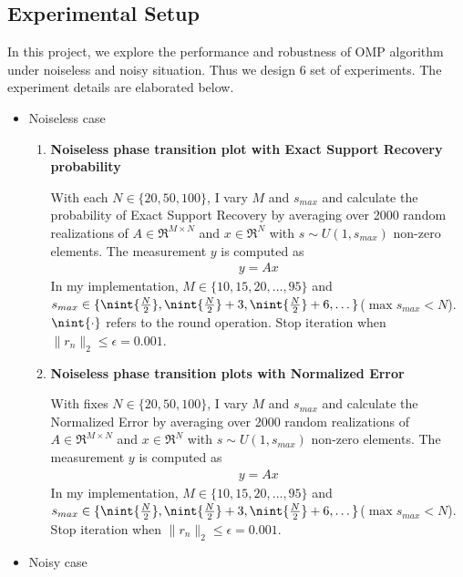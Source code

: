 \documentclass{ucsdreport}
\begin{document}
\subsection{Experimental Setup}
In this project, we explore the performance and robustness of OMP algorithm under noiseless and noisy situation. Thus we design 6 set of experiments. The experiment details are elaborated below.
\begin{itemize}
    \item Noiseless case
    \begin{enumerate}
    
        \item \textbf{Noiseless phase transition plot with Exact Support Recovery probability} 
        
        With each $N \in \{20, 50, 100\}$, I vary $M$ and $s_{max}$ and calculate the probability of Exact Support Recovery by averaging over 2000 random realizations of $A \in \Re^{M \times N}$ and $x \in \Re^N$ with $s\sim U(1,s_{max})$ non-zero elements. The measurement $y$ is computed as
        \begin{align*}
            y = Ax
        \end{align*}
        In my implementation, $M \in \{10,15,20,\dots,95\}$ and $s_{max} \in \{\nint{\frac{N}{2}} ,\nint{\frac{N}{2}}+3, \nint{\frac{N}{2}}+6, \dots\}$($\max s_{max} < N$). $\nint{\cdot}$ refers to the round operation. Stop iteration when $\|r_n\|_2 \leq \epsilon=0.001$.
        
        \item \textbf{Noiseless phase transition plots with Normalized Error}
        
        With fixes $N \in \{20, 50, 100\}$, I vary $M$ and $s_{max}$ and calculate the Normalized Error by averaging over 2000 random realizations of $A \in \Re^{M \times N}$ and $x \in \Re^N$ with $s\sim U(1,s_{max})$ non-zero elements. The measurement $y$ is computed as
        \begin{align*}
            y = Ax
        \end{align*}
        In my implementation, $M \in \{10,15,20,\dots,95\}$ and $s_{max} \in \{\nint{\frac{N}{2}} ,\nint{\frac{N}{2}}+3, \nint{\frac{N}{2}}+6, \dots\}$($\max s_{max} < N$). Stop iteration when $\|r_n\|_2 \leq \epsilon=0.001$.
        
    \end{enumerate}
    \item Noisy case 
    \begin{enumerate}
    

\end{enumerate}
\end{itemize}
\end{document}
